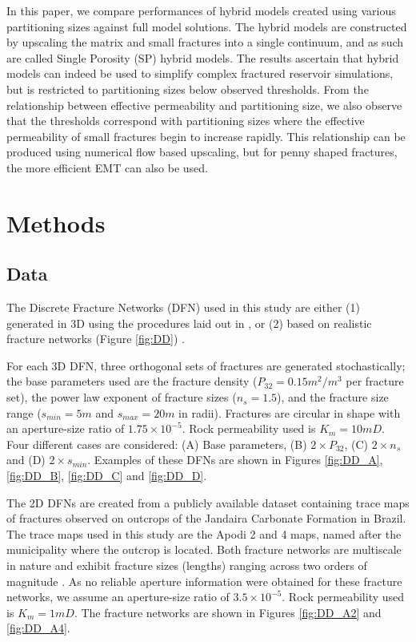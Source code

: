\documentclass[a4paper]{article}
\begin{document}
In this paper, we compare performances of hybrid models created using various partitioning sizes against full model solutions. The hybrid models are constructed by upscaling the matrix and small fractures into a single continuum, and as such are called Single Porosity (SP) hybrid models. The results ascertain that hybrid models can indeed be used to simplify complex fractured reservoir simulations, but is restricted to partitioning sizes below observed thresholds. From the relationship between effective permeability and partitioning size, we also observe that the thresholds correspond with partitioning sizes where the effective permeability of small fractures begin to increase rapidly. This relationship can be produced using numerical flow based upscaling, but for penny shaped fractures, the more efficient EMT can also be used.

\section{Methods}

\subsection{Data}
The Discrete Fracture Networks (DFN) used in this study are either (1) generated in 3D using the procedures laid out in \citet{Priest1993}, or (2) based on realistic fracture networks (Figure \ref{fig:DD}) \citep{Bisdom2017}.

For each 3D DFN, three orthogonal sets of fractures are generated stochastically; the base parameters used are the fracture density ($P_{32}=0.15m^2/m^3$ per fracture set), the power law exponent of fracture sizes ($n_s=1.5$), and the fracture size range ($s_{min}=5m$ and $s_{max}=20m$ in radii). Fractures are circular in shape with an aperture-size ratio of $1.75\times 10^{-5}$. Rock permeability used is $K_m=10mD$. Four different cases are considered: (A) Base parameters, (B) $2\times P_{32}$, (C) $2\times n_s$ and (D) $2\times s_{min}$. Examples of these DFNs are shown in Figures \ref{fig:DD_A}, \ref{fig:DD_B}, \ref{fig:DD_C} and \ref{fig:DD_D}.

The 2D DFNs are created from a publicly available dataset containing trace maps of fractures observed on outcrops of the Jandaira Carbonate Formation in Brazil. The trace maps used in this study are the Apodi 2 and 4 maps, named after the municipality where the outcrop is located. Both fracture networks are multiscale in nature and exhibit fracture sizes (lengths) ranging across two orders of magnitude \citep{Bisdom2017}. As no reliable aperture information were obtained for these fracture networks, we assume an aperture-size ratio of $3.5\times 10^{-5}$. Rock permeability used is $K_m=1mD$. The fracture networks are shown in Figures \ref{fig:DD_A2} and \ref{fig:DD_A4}.
\end{document}
